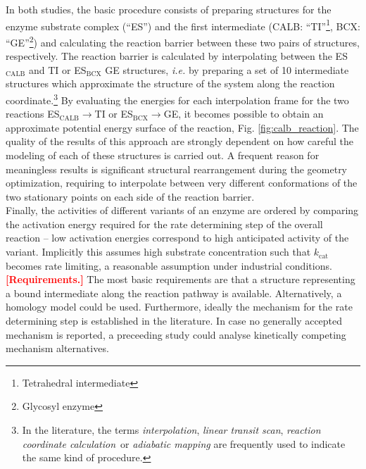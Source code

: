 In both studies, the basic procedure consists of preparing structures for the enzyme substrate complex (``ES'') and the first intermediate (CALB: ``TI''\footnote{Tetrahedral intermediate}, BCX: ``GE''\footnote{\label{foot:ge}Glycosyl enzyme}) and calculating the reaction barrier between these two pairs of structures, respectively.
The reaction barrier is calculated by interpolating between the ES$_\text{CALB}$ and TI or ES$_\text{BCX}$ GE structures, \textit{i.e.} by preparing a set of 10 intermediate structures which approximate the structure of the system along the reaction coordinate.\footnote{In the literature, the terms \textit{interpolation}, \textit{linear transit scan}, \textit{reaction coordinate calculation} or \textit{adiabatic mapping} are frequently used to indicate the same kind of procedure.}
By evaluating the energies for each interpolation frame for the two reactions ES$_\text{CALB}\rightarrow$TI or ES$_\text{BCX}\rightarrow$GE, it becomes possible to obtain an approximate potential energy surface of the reaction, Fig. \ref{fig:calb_reaction}.
The quality of the results of this approach are strongly dependent on how careful the modeling of each of these structures is carried out.
A frequent reason for meaningless results is significant structural rearrangement during the geometry optimization, requiring to interpolate between very different conformations of the two stationary points on each side of the reaction barrier.\\
Finally, the activities of different variants of an enzyme are ordered by comparing the activation energy required for the rate determining step of the overall reaction -- low activation energies correspond to high anticipated activity of the variant.
Implicitly this assumes high substrate concentration such that $k_\text{cat}$ becomes rate limiting, a reasonable assumption under industrial conditions.\\
\textcolor{red}{\textbf{[Requirements.]}}
The most basic requirements are that a structure representing a bound intermediate along the reaction pathway is available.
Alternatively, a homology model could be used.
Furthermore, ideally the mechanism for the rate determining step is established in the literature.
In case no generally accepted mechanism is reported, a preceeding study could analyse kinetically competing mechanism alternatives.\\
